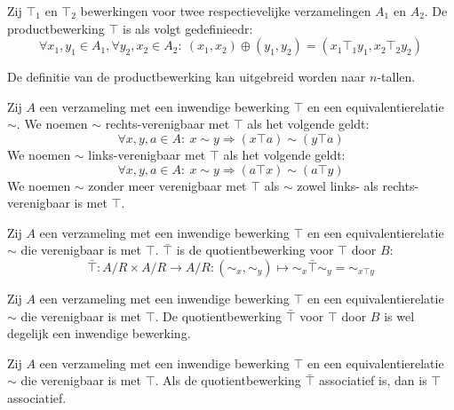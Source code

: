 \documentclass[main.tex]{subfiles}
\begin{document}
\begin{de}
  Zij $\top_{1}$ en $\top_{2}$ bewerkingen voor twee respectievelijke verzamelingen $A_{1}$ en $A_{2}$.
  De productbewerking $\top$ is als volgt gedefinieedr:
  \[ \forall x_{1},y_{1} \in A_{1}, \forall y_{2},x_{2} \in A_{2}:\ (x_{1},x_{2}) \oplus (y_{1},y_{2}) = (x_{1}\top_{1}y_{1}, x_{2}\top_{2} y_{2}) \]
\end{de}

\begin{opm}
  De definitie van de productbewerking kan uitgebreid worden naar $n$-tallen.
\end{opm}

\begin{de}
  Zij $A$ een verzameling met een inwendige bewerking $\top$ en een equivalentierelatie $\sim$.
  We noemen $\sim$ rechts-verenigbaar met $\top$ als het volgende geldt:
  \[ \forall x,y,a \in A:\ x\sim y \Rightarrow (x\top a) \sim (y \top a) \]
  We noemen $\sim$ links-verenigbaar met $\top$ als het volgende geldt:
  \[ \forall x,y,a \in A:\ x\sim y \Rightarrow (a\top x) \sim (a \top y) \]
  We noemen $\sim$ zonder meer verenigbaar met $\top$ als $\sim$ zowel links- als rechts-verenigbaar is met $\top$. 
\end{de}

\begin{de}
    Zij $A$ een verzameling met een inwendige bewerking $\top$ en een equivalentierelatie $\sim$ die verenigbaar is met $\top$.
    $\bar{\top}$ is de quotientbewerking voor $\top$ door $B$:
  \[ \bar{\top}: A/R \times A/R \rightarrow A/R: (\sim_{x},\sim_{y}) \mapsto \sim_{x} \bar{\top} \sim_{y} = \sim_{x\top y} \]
\end{de}
 
\begin{st}
    Zij $A$ een verzameling met een inwendige bewerking $\top$ en een equivalentierelatie $\sim$ die verenigbaar is met $\top$.
    De quotientbewerking $\bar{\top}$ voor $\top$ door $B$ is wel degelijk een inwendige bewerking.
  
\end{st}

\begin{st}
    Zij $A$ een verzameling met een inwendige bewerking $\top$ en een equivalentierelatie $\sim$ die verenigbaar is met $\top$.
    Als de quotientbewerking $\bar{\top}$ associatief is, dan is $\top$ associatief.
  
\end{st}
\end{document}

